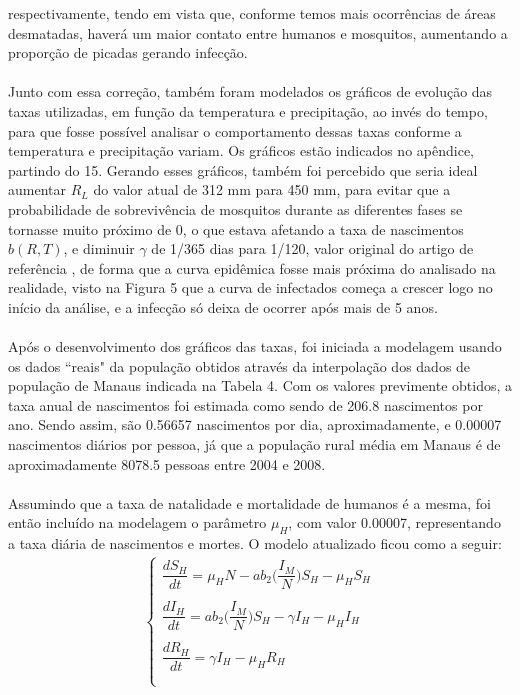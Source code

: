 respectivamente, tendo em vista que, conforme temos mais ocorrências de áreas 
desmatadas, haverá um maior contato entre humanos e mosquitos, aumentando a 
proporção de picadas gerando infecção. 
\\\\
Junto com essa correção, também 
foram modelados os gráficos de evolução das taxas utilizadas, em função 
da temperatura e precipitação, ao invés do tempo, para que fosse 
possível analisar o comportamento dessas taxas conforme a temperatura e 
precipitação variam. Os gráficos estão indicados no apêndice, partindo do 15. 
Gerando esses gráficos, também foi percebido que seria ideal aumentar $R_L$ 
do valor atual de 312 mm para 450 mm, para evitar que a probabilidade de 
sobrevivência de mosquitos durante as diferentes fases se 
tornasse muito próximo de 0, o que estava afetando a taxa de 
nascimentos $b(R,T)$, e diminuir $\gamma$ de 1/365 dias para 1/120, valor original
do artigo de referência \cite{Parham2010}, de forma que a curva epidêmica fosse mais
próxima do analisado na realidade, visto na Figura 5 que a curva de infectados começa
a crescer logo no início da análise, e a infecção só deixa de ocorrer após mais de
5 anos.
\\\\
Após o desenvolvimento dos gráficos das taxas, foi iniciada a modelagem usando os dados 
``reais" da população obtidos através da interpolação dos dados de população de Manaus indicada na Tabela 4.
Com os valores previmente obtidos, a taxa anual de nascimentos foi estimada como sendo de 206.8 
nascimentos por ano. Sendo assim, são 0.56657 nascimentos por dia, aproximadamente, e 0.00007 nascimentos
diários por pessoa, já que a população rural média em Manaus é de aproximadamente 8078.5 pessoas entre 2004 e 2008.
\\\\
Assumindo que a taxa de natalidade e mortalidade de humanos é a mesma, foi então incluído na 
modelagem o parâmetro $\mu_H$, com valor 0.00007, representando a taxa diária de 
nascimentos e mortes. O modelo atualizado ficou como a seguir:
\begin{gather*}
\begin{cases}
\dfrac{dS_H}{dt} = \mu_HN-ab_2\bigg(\dfrac{I_M}{N}\bigg)S_H - \mu_HS_H\\
\\
\dfrac{dI_H}{dt} = ab_2\bigg(\dfrac{I_M}{N}\bigg)S_H-\gamma I_H - \mu_HI_H\\
\\
\dfrac{dR_H}{dt} = \gamma I_H - \mu_HR_H\\
\\
\end{cases}
\end{gather*}

